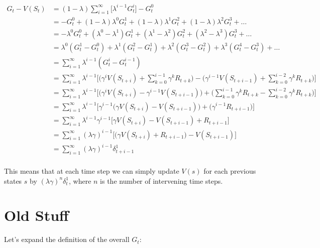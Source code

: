 \documentclass[11pt]{article}
\begin{document}
\begin{align*}
G_t - V(S_t) &= (1-\lambda)\sum_{i=1}^\infty \big[\lambda^{i-1} G^i_t \big] - G^0_t \\
&= -G^0_t + (1 - \lambda)\lambda^0 G^1_t + (1 - \lambda)\lambda^1 G^2_t + (1 - \lambda)\lambda^2 G^3_t + \dots \\
&= -\lambda^0 G^0_t + (\lambda^0 - \lambda^1) G^1_t + (\lambda^1 - \lambda^2) G^2_t + (\lambda^2 - \lambda^3) G^3_t + \dots \\
&= \lambda^0(G^1_t - G^0_t) + \lambda^1(G^2_t - G^1_t) + \lambda^2(G^3_t - G^2_t) + \lambda^3(G^4_t - G^3_t) + \dots \\
&= \sum_{i=1}^\infty \lambda^{i-1}(G^i_t - G^{i-1}_t) \\
&= \sum_{i=1}^\infty \lambda^{i-1}\bigg[\big(\gamma^i V(S_{t+i}) + \sum_{k=0}^{i - 1} \gamma^k R_{t+k}\big) - \big(\gamma^{i-1} V(S_{t+i-1}) + \sum_{k=0}^{i - 2} \gamma^k R_{t+k}\big) \bigg] \\
&= \sum_{i=1}^\infty \lambda^{i-1}\bigg[\big(\gamma^i V(S_{t+i}) - \gamma^{i-1} V(S_{t+i-1}) \big) + \big(\sum_{k=0}^{i - 1} \gamma^k R_{t+k} - \sum_{k=0}^{i - 2} \gamma^k R_{t+k}\big) \bigg] \\
&= \sum_{i=1}^\infty \lambda^{i-1}\bigg[\gamma^{i-1}\big(\gamma V(S_{t+i}) - V(S_{t+i-1}) \big) + \big(\gamma^{i-1} R_{t + i - 1}\big) \bigg] \\
&= \sum_{i=1}^\infty \lambda^{i-1}\gamma^{i-1}\bigg[\gamma V(S_{t+i}) - V(S_{t+i-1}) + R_{t + i - 1} \bigg] \\
&= \sum_{i=1}^\infty (\lambda\gamma)^{i-1}\bigg[\big(\gamma V(S_{t+i}) + R_{t + i - 1}\big) - V(S_{t+i-1}) \bigg] \\
&= \sum_{i=1}^\infty (\lambda\gamma)^{i-1}\delta^1_{t + i - 1} \\
\end{align*}

This means that at each time step we can simply update $V(s)$ for each previous states $s$ by $(\lambda\gamma)^n\delta^1_t$,
where $n$ is the number of intervening time steps.

\section{Old Stuff}

Let's expand the definition of the overall $G_t$:
\end{document}
